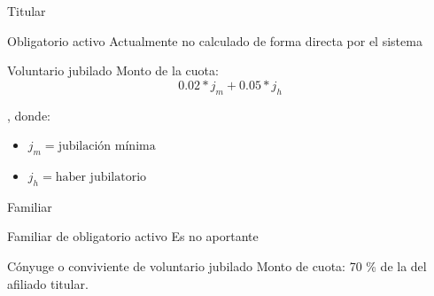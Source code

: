 \documentclass[10pt]{beamer}
\begin{document}
\begin{frame}{Titular}
    \begin{block}{Obligatorio activo}
        Actualmente no calculado de forma directa por el sistema
    \end{block}
    \begin{block}{Voluntario jubilado}
        Monto de la cuota:
        \begin{displaymath}
        0.02 * j_m + 0.05 * j_h
        \end{displaymath}

        , donde:
        \begin{itemize}
            \item $j_m = \text{jubilación mínima}$
            \item $j_h = \text{haber jubilatorio}$
        \end{itemize}
    \end{block}
\end{frame}

\begin{frame}{Familiar}
    \begin{block}{Familiar de obligatorio activo}
        Es no aportante
    \end{block}
    \begin{block}{Cónyuge o conviviente de voluntario jubilado}
        Monto de cuota:  70 \% de la del afiliado titular.
    \end{block}
\end{frame}

\end{document}
